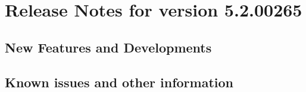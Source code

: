 \makeatletter
\section{Release Notes for \app{} version 5.2.00265}
\makeatother

\subsection{New Features and Developments}


\subsection{Known issues and other information}

